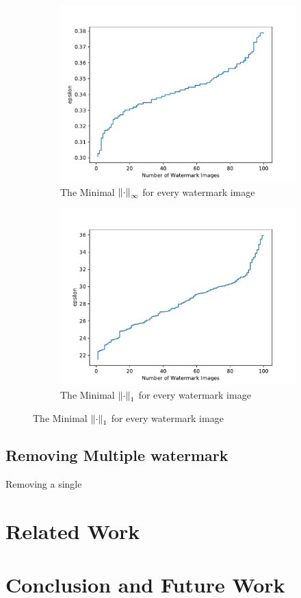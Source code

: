 \documentclass[a4paper]{llncs}
\begin{document}
\begin{figure}[h!]
  \centering
  \begin{subfigure}{0.4\linewidth}
    \includegraphics[width=\linewidth]{../data/results/problem1/mnist_w_wm.pdf}
     \caption{The Minimal $\left\lVert\cdot\right\rVert_{\infty}$ for every watermark image}
  \end{subfigure}
  \begin{subfigure}{0.4\linewidth}
    \includegraphics[width=\linewidth]{../data/results/problem2/mnist_w_wm.pdf}
    \caption{The Minimal $\left\lVert\cdot\right\rVert_1$ for every watermark image}
  \end{subfigure}
  
  \label{fig:minimalEpsilonSingle}
\end{figure}

\subsection{Removing Multiple watermark}

Removing a single 


\section{Related Work}
\label{sec:relatedWork}

\section{Conclusion and Future Work}
\label{sec:conclusion}




\end{document}

